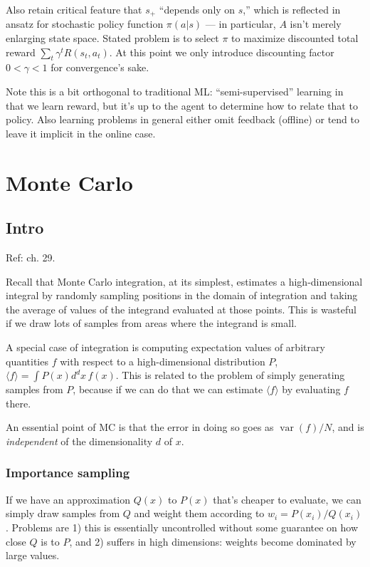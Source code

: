 \documentclass[notitlepage,openany,11pt]{report}
\DeclareMathOperator{\var}{var}
\theoremstyle{plain}%
\numberwithin{equation}{section}
\begin{document}
Also retain critical feature that $s_{+}$ ``depends only on $s$,''  which is reflected in ansatz for stochastic policy function $\pi(a|s)$ --- in particular, $A$ isn't merely enlarging state space. Stated problem is to select $\pi$ to maximize discounted total reward $\sum_{t} \gamma^{t} R(s_{t}, a_{t})$. At this point we only introduce discounting factor $0 < \gamma < 1$ for convergence's sake.

Note this is a bit orthogonal to traditional ML: ``semi-supervised'' learning in that we learn reward, but it's up to the agent to determine how to relate that to policy. Also learning problems in general either omit feedback (offline) or tend to leave it implicit in the online case.


\section{Monte Carlo} 

\subsection{Intro} Ref: \cite{MacKay:03} ch. 29.

Recall that Monte Carlo integration, at its simplest, estimates a high-dimensional integral by randomly sampling positions in the domain of integration  and taking the average of values of the integrand evaluated at those points. This is wasteful if we draw lots of samples from areas where the integrand is small.

A special case of integration is computing expectation values of arbitrary quantities $f$ with respect to a high-dimensional distribution $P$, $\langle f \rangle = \int \! P(x) d^{d} x \, f(x)$. This is related to the problem of simply generating samples from $P$, because if we can do that we can estimate  $\langle f \rangle$ by evaluating $f$ there. 

An essential point of MC is that the error in doing so goes as $\var(f) / N$, and is \emph{independent} of the dimensionality $d$ of $x$. 

\subsubsection{Importance sampling} 
If we have an approximation $Q(x)$ to $P(x)$ that's cheaper to evaluate, we can simply draw samples from $Q$ and weight them according to $w_{i} = P(x_{i}) / Q(x_{i})$. Problems are 1) this is essentially uncontrolled without some guarantee on how close $Q$ is to $P$, and 2) suffers in high dimensions: weights become dominated by large values.
\end{document}
